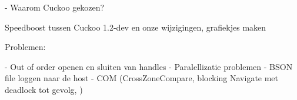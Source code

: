 
- Waarom Cuckoo gekozen?

Speedboost tussen Cuckoo 1.2-dev en onze wijzigingen, grafiekjes maken

Problemen:

- Out of order openen en sluiten van handles 
- Paralellizatie problemen
- BSON file loggen naar de host
- COM (CrossZoneCompare, blocking Navigate met deadlock tot gevolg, )